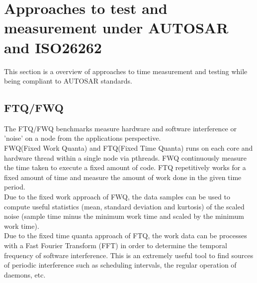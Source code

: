 \section{Approaches to test and measurement under AUTOSAR and ISO26262}
This section is a overview of approaches to time measurement and testing while being compliant to AUTOSAR standards.
\subsection*{FTQ/FWQ}

The FTQ/FWQ benchmarks measure hardware and software interference or 'noise' on a node from the applications perspective.\\
FWQ(Fixed Work Quanta) and FTQ(Fixed Time Quanta) runs on each core and hardware thread within a single node via pthreads. FWQ continuously  measure the time taken to execute a fixed amount of code. FTQ repetitively works for a fixed amount of time and measure the amount of work done in the given time period.\\
Due to the fixed work approach of FWQ, the data samples can be used to compute useful statistics (mean, standard deviation and kurtosis) of the scaled noise (sample time minus the minimum work time and scaled by the minimum work time). \\
Due to the fixed time quanta approach of FTQ, the work data can be processes with a Fast Fourier Transform (FFT) in order to determine the temporal frequency of software interference.  This is an extremely useful tool to find sources of periodic interference such as scheduling intervals, the regular operation of daemons, etc. 
